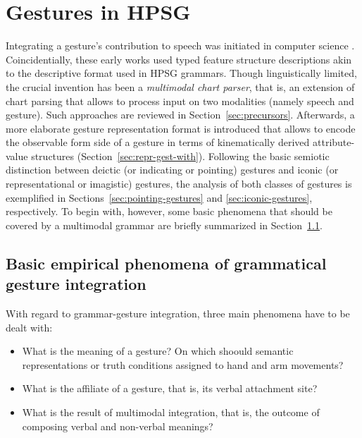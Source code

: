 \documentclass[output=paper]{langsci/langscibook}
\begin{document}
\section{Gestures in HPSG}
\label{sec:gestures-hpsg}

Integrating a gesture's contribution to speech was initiated in computer science \citep{Bolt:1980}.
%
Coincidentially, these early works used typed feature structure descriptions akin to the descriptive format used in HPSG grammars.
%
Though linguistically limited, the crucial invention has been a \emph{multimodal chart parser},  that is, an extension of chart parsing that allows to process input on two modalities (namely speech and gesture).
%
Such approaches are reviewed in Section~\ref{sec:precursors}.
%
Afterwards, a more elaborate gesture representation format is introduced that allows to encode the observable form side of a gesture in terms of kinematically derived attribute-value structures (Section~\ref{sec:repr-gest-with}).
%
Following the basic semiotic distinction between deictic (or indicating or pointing) gestures and iconic (or representational or imagistic) gestures, the analysis of both classes of gestures is exemplified in Sections~\ref{sec:pointing-gestures} and \ref{sec:iconic-gestures}, respectively.
%
To begin with, however, some basic phenomena that should be covered by a multimodal grammar are briefly summarized in Section~\ref{sec:empir-desid-gramm}.



\subsection{Basic empirical phenomena of grammatical gesture integration}
\label{sec:empir-desid-gramm}

With regard to grammar-gesture integration, three main phenomena have to be dealt with:
%
\begin{itemize}
\item What is the meaning of a gesture? On which shoould semantic representations or truth conditions assigned to hand and arm movements? 
\item What is the affiliate of a gesture, that is, its verbal attachment site?  
\item What is the result of multimodal integration, that is, the outcome of composing verbal and non-verbal meanings? 
\end{itemize}
\end{document}
